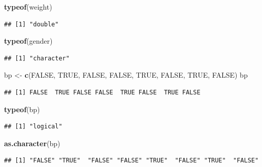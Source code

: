\documentclass[]{article}
\newenvironment{Shaded}{\begin{snugshade}}{\end{snugshade}}
\newcommand{\KeywordTok}[1]{\textcolor[rgb]{0.13,0.29,0.53}{\textbf{#1}}}
\newcommand{\StringTok}[1]{\textcolor[rgb]{0.31,0.60,0.02}{#1}}
\newcommand{\OtherTok}[1]{\textcolor[rgb]{0.56,0.35,0.01}{#1}}
\newcommand{\NormalTok}[1]{#1}
\begin{document}
\begin{Shaded}
\begin{Highlighting}[]
\KeywordTok{typeof}\NormalTok{(weight)}
\end{Highlighting}
\end{Shaded}

\begin{verbatim}
## [1] "double"
\end{verbatim}

\begin{Shaded}
\begin{Highlighting}[]
\KeywordTok{typeof}\NormalTok{(gender)}
\end{Highlighting}
\end{Shaded}

\begin{verbatim}
## [1] "character"
\end{verbatim}

\begin{Shaded}
\begin{Highlighting}[]
\NormalTok{bp <-}\StringTok{ }\KeywordTok{c}\NormalTok{(}\OtherTok{FALSE}\NormalTok{, }\OtherTok{TRUE}\NormalTok{, }\OtherTok{FALSE}\NormalTok{, }\OtherTok{FALSE}\NormalTok{, }\OtherTok{TRUE}\NormalTok{, }\OtherTok{FALSE}\NormalTok{, }\OtherTok{TRUE}\NormalTok{, }\OtherTok{FALSE}\NormalTok{)}
\NormalTok{bp}
\end{Highlighting}
\end{Shaded}

\begin{verbatim}
## [1] FALSE  TRUE FALSE FALSE  TRUE FALSE  TRUE FALSE
\end{verbatim}

\begin{Shaded}
\begin{Highlighting}[]
\KeywordTok{typeof}\NormalTok{(bp)}
\end{Highlighting}
\end{Shaded}

\begin{verbatim}
## [1] "logical"
\end{verbatim}

\begin{Shaded}
\begin{Highlighting}[]
\KeywordTok{as.character}\NormalTok{(bp)}
\end{Highlighting}
\end{Shaded}

\begin{verbatim}
## [1] "FALSE" "TRUE"  "FALSE" "FALSE" "TRUE"  "FALSE" "TRUE"  "FALSE"
\end{verbatim}
\end{document}
